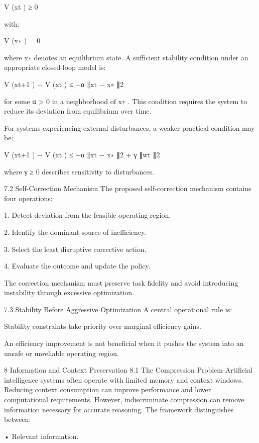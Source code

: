 \documentclass[10pt,a4paper]{article}
\begin{document}
\begin{ManuscriptText}
                                          V (xt ) ≥ 0

    with:

                                         V (x∗ ) = 0

    where x∗ denotes an equilibrium state.
    A sufficient stability condition under an appropriate closed-loop model is:

                            V (xt+1 ) − V (xt ) ≤ −α ∥xt − x∗ ∥2

    for some α > 0 in a neighborhood of x∗ .
    This condition requires the system to reduce its deviation from equilibrium over time.


    For systems experiencing external disturbances, a weaker practical condition may be:

                        V (xt+1 ) − V (xt ) ≤ −α ∥xt − x∗ ∥2 + γ ∥wt ∥2

    where γ ≥ 0 describes sensitivity to disturbances.


7.2     Self-Correction Mechanism
The proposed self-correction mechanism contains four operations:

    1. Detect deviation from the feasible operating region.

    2. Identify the dominant source of inefficiency.

    3. Select the least disruptive corrective action.

    4. Evaluate the outcome and update the policy.

   The correction mechanism must preserve task fidelity and avoid introducing instability
through excessive optimization.


7.3     Stability Before Aggressive Optimization
A central operational rule is:

             Stability constraints take priority over marginal efficiency gains.

    An efficiency improvement is not beneficial when it pushes the system into an unsafe
or unreliable operating region.


8      Information and Context Preservation
8.1     The Compression Problem
Artificial intelligence systems often operate with limited memory and context windows.
   Reducing context consumption can improve performance and lower computational
requirements.
   However, indiscriminate compression can remove information necessary for accurate
reasoning.
   The framework distinguishes between:

    • Relevant information.


\end{ManuscriptText}
\end{document}
